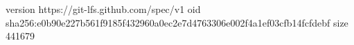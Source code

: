 version https://git-lfs.github.com/spec/v1
oid sha256:e0b90e227b561f9185f432960a0ec2e7d4763306e002f4a1ef03cfb14fcfdebf
size 441679
